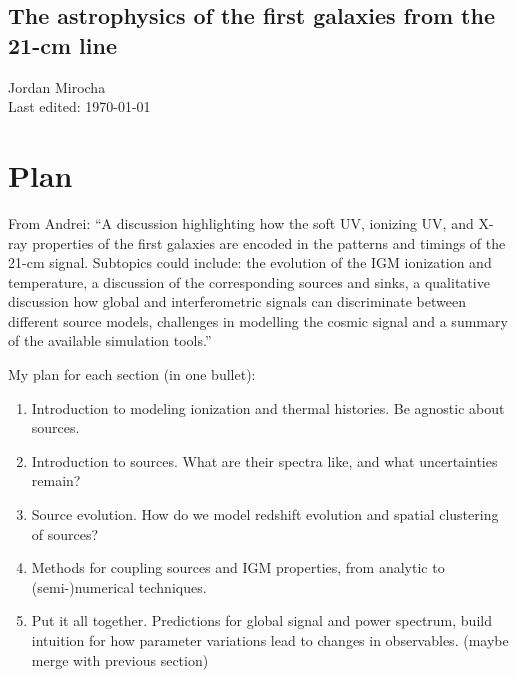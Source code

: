 \documentclass[letterpaper,titlepage,12pt]{article}
\begin{document}
	

\begin{center}
\section*{The astrophysics of the first galaxies from the 21-cm line}
Jordan Mirocha \\
Last edited: \today
\end{center}
\setcounter{equation}{0}

\section{Plan} \vspace{-12pt}
From Andrei: ``A discussion highlighting how the soft UV, ionizing UV, and X-ray properties of the first galaxies are encoded in the patterns and timings of the 21-cm signal. Subtopics could include: the evolution of the IGM ionization and temperature, a discussion of the corresponding sources and sinks, a qualitative discussion how global and interferometric signals can discriminate between different source models, challenges in modelling the cosmic signal and a summary of the available simulation tools.''

My plan for each section (in one bullet):
\begin{enumerate}
    \item Introduction to modeling ionization and thermal histories. Be agnostic about sources.
    \item Introduction to sources. What are their spectra like, and what uncertainties remain?
    \item Source evolution. How do we model redshift evolution and spatial clustering of sources?
    \item Methods for coupling sources and IGM properties, from analytic to (semi-)numerical techniques.
    \item Put it all together. Predictions for global signal and power spectrum, build intuition for how parameter variations lead to changes in observables. (maybe merge with previous section)
\end{enumerate}
\end{document}
